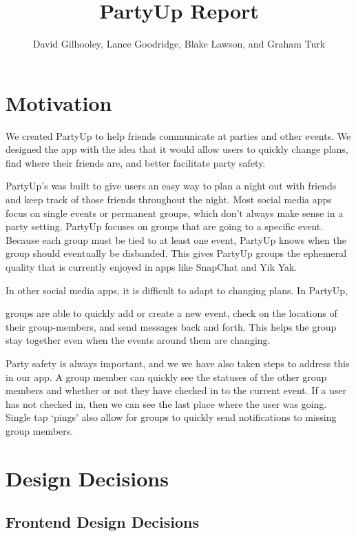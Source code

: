 \documentclass[12pt]{article}
\title{PartyUp Report}
\author{David Gilhooley, Lance Goodridge, Blake Lawson, and Graham Turk}
\begin{document}
\pagestyle{plain}

\maketitle

\section{Motivation} %
\label{sec:Motivation}
We created PartyUp to help friends communicate at parties and other events.
We designed the app with the idea that it would allow users to quickly change plans, find where their friends are, and better facilitate party safety.

PartyUp's was built to give users an easy way to plan a night out with friends and keep track of those friends throughout the night.
Most social media apps focus on single events or permanent groups, which don't always make sense in a party setting.
PartyUp focuses on groups that are going to a specific event.
Because each group must be tied to at least one event, PartyUp knows when the group should eventually be disbanded.
This gives PartyUp groups the ephemeral quality that is currently enjoyed in apps like SnapChat and Yik Yak.

In other social media apps, it is difficult to adapt to changing plans.
In PartyUp, 

groups are able to quickly add or create a new event, check on the locations of their group-members, and send messages back and forth. This helps the group stay together even when the events around them are changing. 

Party safety is always important, and we we have also taken steps to address this in our app. A group member can quickly see the statuses of the other group members and whether or not they have checked in to the current event. If a user has not checked in, then we can see the last place where the user was going. Single tap `pings' also allow for groups to quickly send notifications to missing group members.

\section{Design Decisions} %
\label{sec:design_decisions}


\subsection{Frontend Design Decisions}
\end{document}
